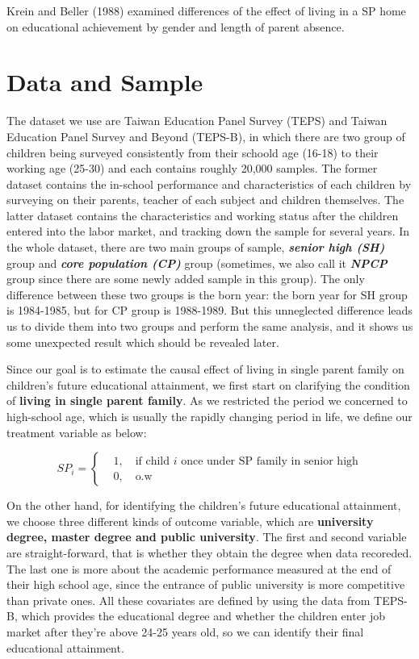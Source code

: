 \documentclass[]{AEA}
\begin{document}
    Krein and Beller (1988) examined differences of the effect of living in a SP home on educational 
achievement by gender and length of parent absence. 


\section{Data and Sample} %

    The dataset we use are Taiwan Education Panel Survey (TEPS) and Taiwan Education Panel Survey and Beyond (TEPS-B), in which there are two group of children being surveyed consistently from their schoold age (16-18) to their working age (25-30) and each contains roughly 20,000 samples. The former dataset contains the in-school performance and characteristics of each children by surveying on their parents, teacher of each subject and children themselves. The latter dataset contains the characteristics and working status after the children entered into the labor market, and tracking down the sample for several years.  In the whole dataset, there are two main groups of sample, \textit{\textbf{senior high (SH)}} group and \textit{\textbf{core population (CP)}} group (sometimes, we also call it \textit{\textbf{NPCP}} group since there are some newly added sample in this group).  The only difference between these two groups is the born year: the born year for SH group is 1984-1985, but for CP group is 1988-1989.  But this unneglected difference leads us to divide them into two groups and perform the same analysis, and it shows us some unexpected result which should be revealed later.

    Since our goal is to estimate the causal effect of living in single parent family on children's future educational attainment, we first start on clarifying the condition of \textbf{living in single parent family}.  As we restricted the period we concerned to high-school age, which is usually the rapidly changing period in life, we define our treatment variable as below:

    \[
        \textit{SP}_i =
        \left\{\begin{aligned}
        &1,\quad\text{if child $i$ once under SP family in senior high} \\
        &0,\quad\text{o.w}
        \end{aligned}\right.
    \]

    On the other hand, for identifying the children's future educational attainment, we choose three different kinds of outcome variable, which are \textbf{university degree, master degree and public university}.   The first and second variable are straight-forward, that is whether they obtain the degree when data recoreded.  The last one is more about the academic performance measured at the end of their high school age, since the entrance of public university is more competitive than private ones.  All these covariates are defined by using the data from TEPS-B, which provides the educational degree and whether the children enter job market after they're above 24-25 years old, so we can identify their final educational attainment.  
    
\end{document}
